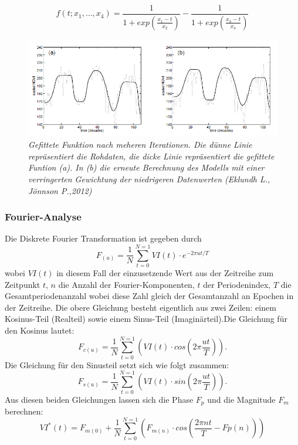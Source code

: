 \documentclass[11pt]{report}
\begin{document}
\begin{equation}
f(t;x_1,\dots,x_4) = \frac{1}{1+exp\left(\frac{x_1-t}{x_2}\right)} - \frac{1}{1+exp\left(\frac{x_3-t}{x_4}\right)}
\end{equation}


\begin{figure}[H]		%
\centering
\includegraphics[scale=0.6]{./Grafiken/Fitting/TIMESATmanuell_adaption_to_the_uper_envelope.PNG}
\caption{\textit{Gefittete Funktion nach meheren Iterationen. Die dünne Linie repräsentiert die Rohdaten, die dicke Linie repräsentiert die gefittete Funtion (a). In (b) die erneute Berechnung des Modells mit einer verringerten Gewichtung der niedrigeren Datenwerten (Eklundh L., Jönnson P.,2012)}}
\end{figure}


\subsubsection{Fourier-Analyse}
Die Diskrete Fourier Transformation ist gegeben durch
\begin{equation}
F_{(u)}=\frac{1}{N}\sum_{t=0}^{N=1}VI(t)\cdot e^{-2\pi ut/T}
\end{equation}
wobei $VI(t)$ in diesem Fall der einzusetzende Wert aus der Zeitreihe zum Zeitpunkt $t$, $n$ die Anzahl der Fourier-Komponenten, $t$ der Periodenindex, $T$ die Gesamtperiodenanzahl wobei diese Zahl gleich der Gesamtanzahl an Epochen in der Zeitreihe. Die obere Gleichung besteht eigentlich aus zwei Zeilen: einem Kosinus-Teil (Realteil) sowie einem Sinus-Teil (Imaginärteil).Die Gleichung für den Kosinus lautet:
\begin{equation}
F_{c(u)}=\frac{1}{N}\sum_{t=0}^{N=1}\left(VI(t)\cdot cos\left(2\pi\frac{ut}{T}\right)\right).
\end{equation}
Die Gleichung für den Sinusteil setzt sich wie folgt zusammen:
\begin{equation}
F_{s(u)}=\frac{1}{N}\sum_{t=0}^{N=1}\left(VI(t)\cdot sin\left(2\pi\frac{ut}{T}\right)\right).
\end{equation}
Aus diesen beiden Gleichungen lassen sich die Phase $F_p$ und die Magnitude $F_m$ berechnen:
\begin{equation}
VI^*(t)=F_{m(0)} + \frac{1}{N}\sum_{t=0}^{N=1}\left(F_{m(n)} \cdot cos\left(\frac{2\pi nt}{T}-F{p(n)}\right)\right)
\end{equation}
\end{document}
